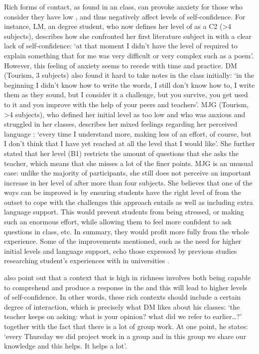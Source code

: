 \documentclass[output=paper]{langsci/langscibook}
\begin{document}
Rich forms of contact, as found in an  class, can provoke anxiety for those who consider they have low , and thus negatively affect levels of self-confidence.  For instance, LM, an  degree student, who now defines her level of  as a C2 (>4  subjects), describes how she confronted her first literature subject in  with a clear lack of self-confidence: ‘at that moment I didn’t have the level of  required to explain something that for me was very difficult or very complex such as a poem’. However, this feeling of anxiety seems to recede with time and practice.  DM (Tourism, 3  subjects) also found it hard to take notes in the  class initially: ‘in the beginning I didn’t know how to write the words, I still don’t know how to, I write them as they sound, but I consider it a challenge, but you survive, you get used to it and you improve with the help of your peers and teachers’. MJG (Tourism, >4  subjects), who defined her initial level as too low and who was anxious and struggled in her classes, describes her mixed feelings regarding her perceived language : ‘every time I understand more, making less of an effort, of course, but I don’t think that I have yet reached at all the level that I would like’. She further stated that her  level (B1) restricts the amount of questions that she asks the teacher, which means that she misses a lot of the finer points.  MJG is an unusual case:  unlike the majority of participants, she still does not perceive an important increase in her level of  after more than four  subjects. She believes that one of the ways  can be improved is by ensuring students have the right level of  from the outset to cope with the challenges this approach entails as well as including extra  language support. This would prevent students from being stressed, or making such an enormous effort, while allowing them to feel more confident to ask questions in class, etc. In summary, they would profit more fully from the whole experience.  Some of  the improvements mentioned, such as  the need for higher initial   levels and language support,  echo those expressed by previous studies researching student’s experiences with  in  universities \citep{AguilarRodríguez2012,Arnó-MaciàMancho-Barés2015}.



\citet{SampasivamClément2014} also point out that a context that is high in richness involves both being capable to comprehend and produce a response in the  and this will lead to higher levels of self-confidence. In other words, these rich contexts should include a certain degree of interaction, which is precisely what DM likes about his  classes: ‘the teacher keeps on asking: what is your opinion? what did we refer to earlier…?’ together with the fact that there is a lot of group work. At one point, he states: ‘every Thursday we did project work in a group and in this group we share our  knowledge and this helps. It helps a lot’. 
\end{document}
